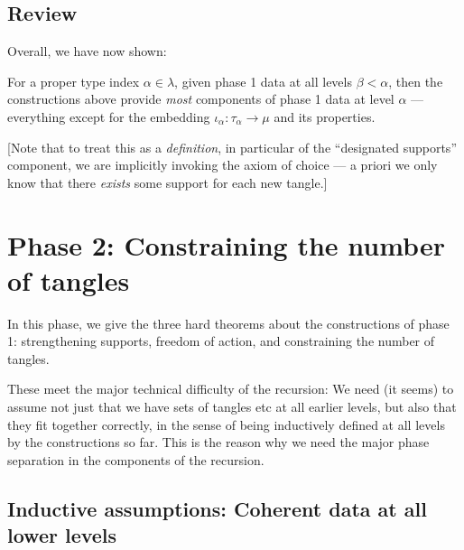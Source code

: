 \section{Review}

Overall, we have now shown:

\begin{definition}
  \label{def:phase-1-data-propagates}
  For a proper type index $\alpha \in \lambda$, given phase 1 data at all levels $\beta < \alpha$, then the constructions above provide \emph{most} components of phase 1 data at level $\alpha$ — everything except for the embedding $\iota_\alpha : \tau_\alpha \to \mu$ and its properties.

  [Note that to treat this as a \emph{definition}, in particular of the “designated supports” component, we are implicitly invoking the axiom of choice --- a priori we only know that there \emph{exists} some support for each new tangle.]
\end{definition}

\newpage

\chapter{Phase 2: Constraining the number of tangles}

In this phase, we give the three hard theorems about the constructions of phase 1: strengthening supports, freedom of action, and constraining the number of tangles.

These meet the major technical difficulty of the recursion: We need (it seems) to assume not just that we have sets of tangles etc at all earlier levels, but also that they fit together correctly, in the sense of being inductively defined at all levels by the constructions so far.  This is the reason why we need the major phase separation in the components of the recursion.

\section{Inductive assumptions: Coherent data at all lower levels}

